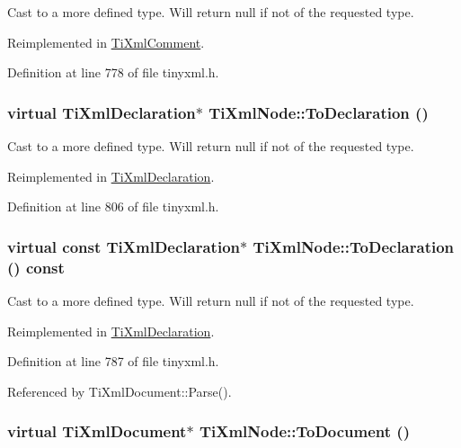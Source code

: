 Cast to a more defined type. Will return null if not of the requested type. 

Reimplemented in \hyperlink{class_ti_xml_comment_a00fb4215c20a2399ea05ac9b9e7e68a0}{TiXmlComment}.

Definition at line 778 of file tinyxml.h.\hypertarget{class_ti_xml_node_a4027136ca820ff4a636b607231b6a6df}{
\subsubsection[{ToDeclaration}]{\setlength{\rightskip}{0pt plus 5cm}virtual {\bf TiXmlDeclaration}$\ast$ TiXmlNode::ToDeclaration ()}}
\label{class_ti_xml_node_a4027136ca820ff4a636b607231b6a6df}


Cast to a more defined type. Will return null if not of the requested type. 

Reimplemented in \hyperlink{class_ti_xml_declaration_a6bd3d1daddcaeb9543c24bfd090969ce}{TiXmlDeclaration}.

Definition at line 806 of file tinyxml.h.\hypertarget{class_ti_xml_node_a9f43e6984fc7d4afd6eb32714c6b7b72}{
\subsubsection[{ToDeclaration}]{\setlength{\rightskip}{0pt plus 5cm}virtual const {\bf TiXmlDeclaration}$\ast$ TiXmlNode::ToDeclaration () const}}
\label{class_ti_xml_node_a9f43e6984fc7d4afd6eb32714c6b7b72}


Cast to a more defined type. Will return null if not of the requested type. 

Reimplemented in \hyperlink{class_ti_xml_declaration_a1e085d3fefd1dbf5ccdbff729931a967}{TiXmlDeclaration}.

Definition at line 787 of file tinyxml.h.

Referenced by TiXmlDocument::Parse().\hypertarget{class_ti_xml_node_a6a4c8ac28ee7a745d059db6691e03bae}{
\subsubsection[{ToDocument}]{\setlength{\rightskip}{0pt plus 5cm}virtual {\bf TiXmlDocument}$\ast$ TiXmlNode::ToDocument ()}}
\label{class_ti_xml_node_a6a4c8ac28ee7a745d059db6691e03bae}


